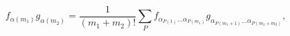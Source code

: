 \begin{equation}
f_{\alpha(m_1)}g_{\alpha(m_2)}=\frac{1}{(m_1+m_2)!}\sum_P 
f_{\alpha_{P(1)}\ldots
\alpha_{P(m_1)}}g_{\alpha_{P(m_1+1)}\ldots\alpha_{P(m_1+m_2)}},
\end{equation}

